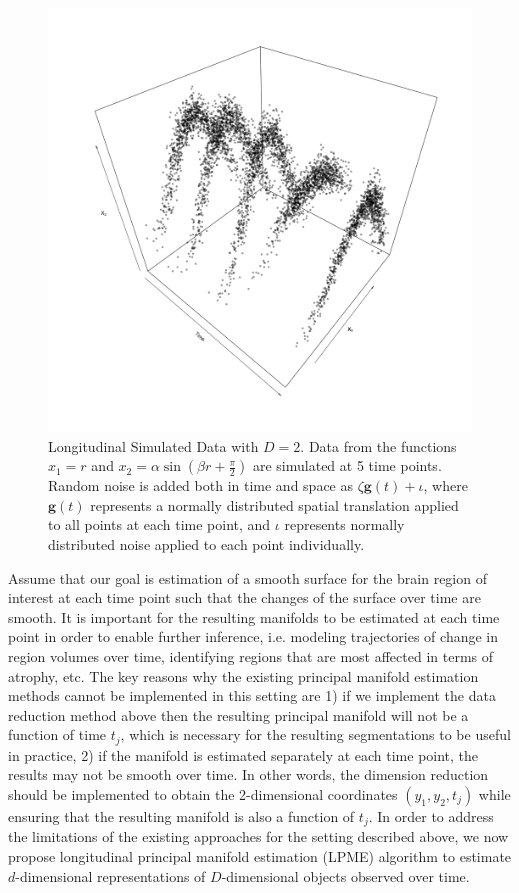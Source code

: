 \documentclass[11pt,reqno]{article}
\theoremstyle{definition}
\begin{document}
\begin{figure}[h]
  \centering
  \includegraphics[scale=0.4]{sim_case1_plot2}
  \caption{Longitudinal Simulated Data with $D = 2$. Data from the functions $x_1 = r$ and $x_2 = \alpha\sin(\beta r + \frac{\pi}{2})$ are simulated at 5 time points. Random noise is added both in time and space as $\zeta \mathbf{g}(t) + \iota$, where $\mathbf{g}(t)$ represents a normally distributed spatial translation applied to all points at each time point, and $\iota$ represents normally distributed noise applied to each point individually.}
  \label{fig:sample_data}
\end{figure}

Assume that our goal is estimation of a smooth surface for the brain region of interest at each time point such that the changes of the surface over time are smooth. It is important for the resulting manifolds to be estimated at each time point in order to enable further inference, i.e. modeling trajectories of change in region volumes over time, identifying regions that are most affected in terms of atrophy, etc. The key reasons why the existing principal manifold estimation methods cannot be implemented in this setting are 1) if we implement the data reduction method above then the resulting principal manifold will not be a function of time $t_j$, which is necessary for the resulting segmentations to be useful in practice, 2) if the manifold is estimated separately at each time point, the results may not be smooth over time. In other words, the dimension reduction should be implemented to obtain the 2-dimensional coordinates $(y_1,y_2,t_j)$ while ensuring that the resulting manifold is also a function of $t_j$. In order to address the limitations of the existing approaches for the setting described above, we now propose longitudinal principal manifold estimation (LPME) algorithm to estimate $d$-dimensional representations of $D$-dimensional objects observed over time.
\end{document}
